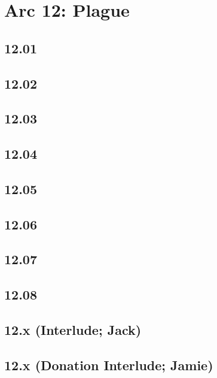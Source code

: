 \part*{Arc 12: Plague}
 \chapter*{12.01}
 \chapter*{12.02}
 \chapter*{12.03}
 \chapter*{12.04}
 \chapter*{12.05}
 \chapter*{12.06}
 \chapter*{12.07}
 \chapter*{12.08}
 \chapter*{12.x (Interlude; Jack)}
 \chapter*{12.x (Donation Interlude; Jamie)}











